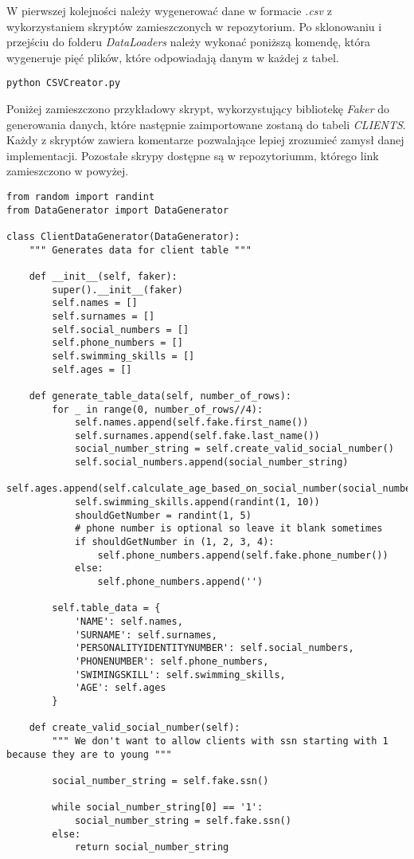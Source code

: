 \documentclass[a4paper]{article}
\begin{document}
W pierwszej kolejności należy wygenerować dane w formacie \textit{.csv} z wykorzystaniem skryptów zamieszczonych w repozytorium. Po sklonowaniu i przejściu do folderu \textit{DataLoaders} należy wykonać poniższą komendę, która wygeneruje pięć plików, które odpowiadają danym w każdej z tabel.

\begin{verbatim}
python CSVCreator.py
\end{verbatim}

Poniżej zamieszczono przykładowy skrypt, wykorzystujący bibliotekę \textit{Faker} do generowania danych, które następnie zaimportowane zostaną do tabeli \textit{CLIENTS}. Każdy z skryptów zawiera komentarze pozwalające lepiej zrozumieć zamysł danej implementacji. Pozostałe skrypy dostępne są w repozytoriumm, którego link zamieszczono w powyżej.

\newpage

\begin{verbatim}
from random import randint
from DataGenerator import DataGenerator

class ClientDataGenerator(DataGenerator):
    """ Generates data for client table """

    def __init__(self, faker):
        super().__init__(faker)
        self.names = []
        self.surnames = []
        self.social_numbers = []
        self.phone_numbers = []
        self.swimming_skills = []
        self.ages = []

    def generate_table_data(self, number_of_rows):
        for _ in range(0, number_of_rows//4):
            self.names.append(self.fake.first_name())
            self.surnames.append(self.fake.last_name())
            social_number_string = self.create_valid_social_number()
            self.social_numbers.append(social_number_string)
            self.ages.append(self.calculate_age_based_on_social_number(social_number_string))
            self.swimming_skills.append(randint(1, 10))
            shouldGetNumber = randint(1, 5)
            # phone number is optional so leave it blank sometimes
            if shouldGetNumber in (1, 2, 3, 4):
                self.phone_numbers.append(self.fake.phone_number())
            else:
                self.phone_numbers.append('')

        self.table_data = {
            'NAME': self.names,
            'SURNAME': self.surnames,
            'PERSONALITYIDENTITYNUMBER': self.social_numbers,
            'PHONENUMBER': self.phone_numbers,
            'SWIMINGSKILL': self.swimming_skills,
            'AGE': self.ages
        }

    def create_valid_social_number(self):
        """ We don't want to allow clients with ssn starting with 1 because they are to young """

        social_number_string = self.fake.ssn()

        while social_number_string[0] == '1':
            social_number_string = self.fake.ssn()
        else:
            return social_number_string

\end{verbatim}
\end{document}
